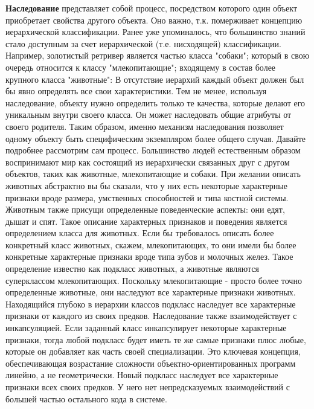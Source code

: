 \textbf{Наследование} представляет собой процесс, посредством которого один объект приобретает свойства другого объекта. Оно важно, т.к. померживает концепцию иерархической классификации. Ранее уже упоминалось, что большинство знаний стало доступным за счет иерархической (т.е. нисходящей) классификации. Например, золотистый ретривер является частью класса "собаки"; который в свою очередь относится к классу "млекопитающие"; входящему в состав более крупного класса "животные": В отсутствие иерархий каждый объект должен был бы явно определять все свои характеристики. Тем не менее, используя наследование, объекту нужно определить только те качества, которые делают его уникальным внутри своего класса. Он может наследовать общие атрибуты от своего родителя. Таким образом, именно механизм наследования позволяет одному объекту быть специфическим экземпляром более общего случая. Давайте подробнее рассмотрим сам процесс. Большинство людей естественным образом воспринимают мир как состоящий из иерархически связанных друг с другом объектов, таких как животные, млекопитающие и собаки. При желании описать животных абстрактно вы бы сказали, что у них есть некоторые характерные признаки вроде размера, умственных способностей и типа костной системы. Животным также присущи определенные поведенческие аспекты: они едят, дышат и спят. Такое описание характерных признаков и поведения является определением класса для животных. Если бы требовалось описать более конкретный класс животных, скажем, млекопитающих, то они имели бы более конкретные характерные признаки вроде типа зубов и молочных желез. Такое определение известно как подкласс животных, а животные являются суперклассом млекопитающих. Поскольку млекопитающие - просто более точно определенные животные, они наследуют все характерные признаки животных. Находящийся глубоко в иерархии классов подкласс наследует все характерные признаки от каждого из своих предков. Наследование также взаимодействует с инкапсуляцией. Если заданный класс инкапсулирует некоторые характерные признаки, тогда любой подкласс будет иметь те же самые признаки плюс любые, которые он добавляет как часть своей специализации. Это ключевая концепция, обеспечивающая возрастание сложности объектно-ориентированных программ линейно, а не геометрически. Новый подкласс наследует все характерные признаки всех своих предков. У него нет непредсказуемых взаимодействий с большей
частью остального кода в системе. \\
